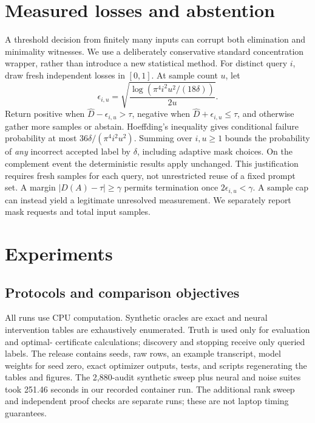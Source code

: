 \documentclass[10pt]{article}
\theoremstyle{definition}\newtheorem{definition}[theorem]{Definition}
\begin{document}
\section{Measured losses and abstention}\label{sec:noise}
A threshold decision from finitely many inputs can corrupt both elimination and
minimality witnesses. We use a deliberately conservative standard concentration
wrapper, rather than introduce a new statistical method. For distinct query $i$,
draw fresh independent losses in $[0,1]$. At sample count $u$, let
\begin{equation}
 \epsilon_{i,u}=\sqrt{\frac{\log(\pi^4 i^2u^2/(18\delta))}{2u}}.
\end{equation}
Return positive when $\widehat D-\epsilon_{i,u}>\tau$, negative when
$\widehat D+\epsilon_{i,u}\le\tau$, and otherwise gather more samples or abstain.
Hoeffding's inequality gives conditional failure probability at most
$36\delta/(\pi^4i^2u^2)$. Summing over $i,u\ge1$ bounds the probability of \emph{any}
incorrect accepted label by $\delta$, including adaptive mask choices. On the
complement event the deterministic results apply unchanged. This justification
requires fresh samples for each query, not unrestricted reuse of a fixed prompt set.
A margin $|D(A)-\tau|\ge\gamma$ permits termination once $2\epsilon_{i,u}<\gamma$.
A sample cap can instead yield a legitimate unresolved measurement. We separately
report mask requests and total input samples.

\section{Experiments}
\subsection{Protocols and comparison objectives}
All runs use CPU computation. Synthetic oracles are exact and neural intervention
tables are exhaustively enumerated. Truth is used only for evaluation and optimal-
certificate calculations; discovery and stopping receive only queried labels.
The release contains seeds, raw rows, an example transcript, model weights for seed
zero, exact optimizer outputs, tests, and scripts regenerating the tables and figures.
The 2,880-audit synthetic sweep plus neural and noise suites took 251.46 seconds in
our recorded container run. The additional rank sweep and independent proof checks
are separate runs; these are not laptop timing guarantees.
\end{document}
